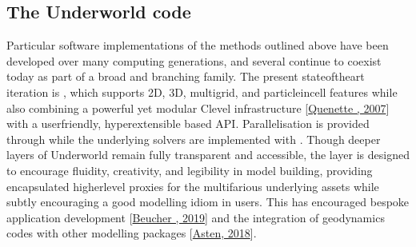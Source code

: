 \documentclass[letterpaper,10pt,english]{jupyterBook}
\begin{document}
\subsection{The Underworld code}
\label{\detokenize{content/chapter_02_methods/section2:the-underworld-code}}
\sphinxAtStartPar
Particular software implementations of the methods outlined above have been developed over many computing generations, and several continue to co\sphinxhyphen{}exist today as part of a broad and branching family. The present state\sphinxhyphen{}of\sphinxhyphen{}the\sphinxhyphen{}art iteration is , which supports 2D, 3D, multigrid, and particle\sphinxhyphen{}in\sphinxhyphen{}cell features while also combining a powerful yet modular C\sphinxhyphen{}level infrastructure {[}\hyperlink{cite.references:id677}{Quenette , 2007}{]} with a user\sphinxhyphen{}friendly, hyper\sphinxhyphen{}extensible \sphinxhyphen{}based API. Parallelisation is provided through  while the underlying solvers are implemented with . Though deeper layers of Underworld remain fully transparent and accessible, the  layer is designed to encourage fluidity, creativity, and legibility in model building, providing encapsulated higher\sphinxhyphen{}level proxies for the multifarious underlying  assets while subtly encouraging a good modelling idiom in users. This has encouraged bespoke application development {[}\hyperlink{cite.references:id670}{Beucher , 2019}{]} and the integration of geodynamics codes with other modelling packages {[}\hyperlink{cite.references:id681}{Asten, 2018}{]}.
\end{document}
